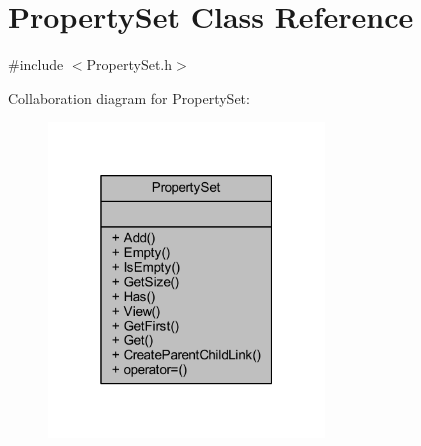 \hypertarget{class_property_set}{}\section{Property\+Set Class Reference}
\label{class_property_set}


{\ttfamily \#include $<$Property\+Set.\+h$>$}



Collaboration diagram for Property\+Set\+:
\nopagebreak
\begin{figure}[H]
\begin{center}
\leavevmode
\includegraphics[width=208pt]{class_property_set__coll__graph}
\end{center}
\end{figure}
